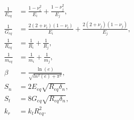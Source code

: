 \begin{equation}
\begin{aligned}
 \frac{1}{E_{eq}} & = \frac{1-\nu_i^2}{E_i} + \frac{1-\nu_j^2}{E_j} ,\\
 \frac{1}{G_{eq}} & = \frac{2(2+\nu_i)(1-\nu_i)}{E_i} + \frac{2(2+\nu_j)(1-\nu_j)}{E_j} ,\\
 \frac{1}{R_{eq}} &= \frac{1}{R_i} + \frac{1}{R_j} ,\\
 \frac{1}{m_{eq}} &= \frac{1}{m_i} + \frac{1}{m_j} ,\\
 \beta & = \frac{\ln(e)}{\sqrt{ln^2(e)+\pi^2}} ,\\
 S_n & = 2 E_{eq} \sqrt{R_{eq} \delta_n} ,\\
 S_t & = 8 G_{eq} \sqrt{R_{eq} \delta_n} ,\\
 k_r & = k_t R_{eq}^2 .\\
\end{aligned}
\label{eq:equivProp2}
\end{equation}

